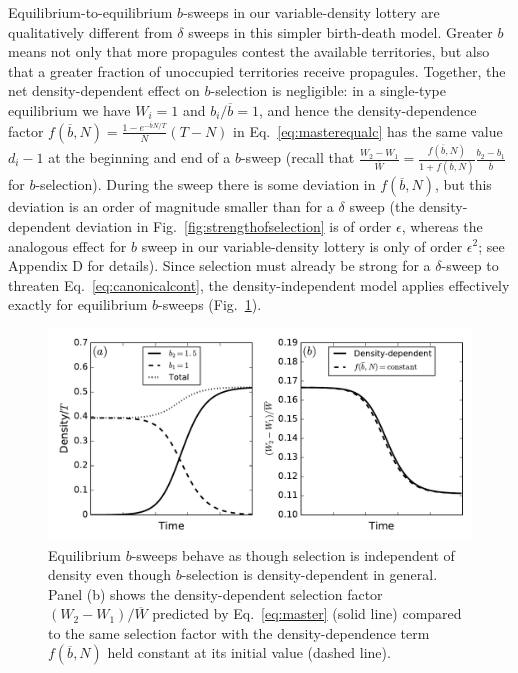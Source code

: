 \documentclass[12pt]{article}
\begin{document}
Equilibrium-to-equilibrium $b$-sweeps in our variable-density lottery are qualitatively different from $\delta$ sweeps in this simpler birth-death model. Greater $b$ means not only that more propagules contest the available territories, but also that a greater fraction of unoccupied territories receive propagules. Together, the net density-dependent effect on $b$-selection is negligible: in a single-type equilibrium we have $W_i=1$ and $b_i/\overline{b}=1$, and hence the density-dependence factor $f(\overline{b},N)=\frac{1-e^{-\overline{b}N/T}}{N}(T-N)$ in Eq.~\eqref{eq:masterequalc} has the same value $d_i-1$ at the beginning and end of a $b$-sweep (recall that $\frac{W_2-W_1}{\overline{W}}=\frac{f(\overline{b},N)}{1+f(\overline{b},N)}\frac{b_2-b_1}{\overline{b}}$ for $b$-selection). During the sweep there is some deviation in $f(\overline{b},N)$, but this deviation is an order of magnitude smaller than for a $\delta$ sweep (the density-dependent deviation in Fig.~\ref{fig:strengthofselection} is of order $\epsilon$, whereas the analogous effect for $b$ sweep in our variable-density lottery is only of order $\epsilon^2$; see Appendix D for details). Since selection must already be strong for a $\delta$-sweep to threaten Eq.~\eqref{eq:canonicalcont}, the density-independent model applies effectively exactly for equilibrium $b$-sweeps (Fig.~\ref{fig:bsweep}).

\begin{figure}
\centering
\includegraphics[scale=0.8]{bsweep.pdf}
\caption{\label{fig:bsweep} Equilibrium $b$-sweeps behave as though selection is independent of density even though $b$-selection is density-dependent in general. Panel (b) shows the density-dependent selection factor $(W_2-W_1)/\overline{W}$ predicted by Eq.~\eqref{eq:master} (solid line) compared to the same selection factor with the density-dependence term $f(\overline{b},N)$ held constant at its initial value (dashed line).}
\end{figure}
\end{document}
